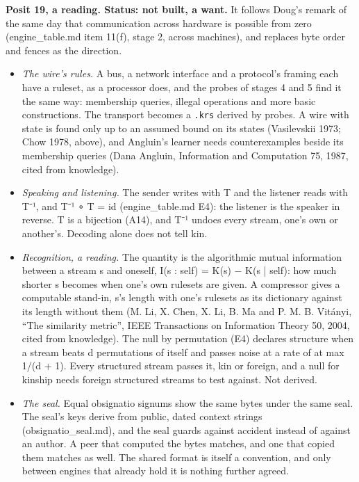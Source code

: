 \textbf{Posit 19, a reading. Status: not built, a want.} It follows Doug's remark of the same day that communication across hardware is possible from zero (engine\_\allowbreak{}table.md item 11(f), stage 2, across machines), and replaces byte order and fences as the direction.

\begin{itemize}
\item \emph{The wire's rules.} A bus, a network interface and a protocol's framing each have a ruleset, as a processor does, and the probes of stages 4 and 5 find it the same way: membership queries, illegal operations and more basic constructions. The transport becomes a \texttt{.\allowbreak{}krs} derived by probes. A wire with state is found only up to an assumed bound on its states (Vasilevskii 1973; Chow 1978, above), and Angluin's learner needs counterexamples beside its membership queries (Dana Angluin, Information and Computation 75, 1987, cited from knowledge).
\item \emph{Speaking and listening.} The sender writes with T and the listener reads with T⁻¹, and T⁻¹ ∘ T = id (engine\_\allowbreak{}table.md E4): the listener is the speaker in reverse. T is a bijection (A14), and T⁻¹ undoes every stream, one's own or another's. Decoding alone does not tell kin.
\item \emph{Recognition, a reading.} The quantity is the algorithmic mutual information between a stream s and oneself, I(s : self) = K(s) − K(s | self): how much shorter s becomes when one's own rulesets are given. A compressor gives a computable stand-in, s's length with one's rulesets as its dictionary against its length without them (M. Li, X. Chen, X. Li, B. Ma and P. M. B. Vitányi, “The similarity metric”, IEEE Transactions on Information Theory 50, 2004, cited from knowledge). The null by permutation (E4) declares structure when a stream beats d permutations of itself and passes noise at a rate of at max 1/(d + 1). Every structured stream passes it, kin or foreign, and a null for kinship needs foreign structured streams to test against. Not derived.
\item \emph{The seal.} Equal obsignatio signums show the same bytes under the same seal. The seal's keys derive from public, dated context strings (obsignatio\_\allowbreak{}seal.md), and the seal guards against accident instead of against an author. A peer that computed the bytes matches, and one that copied them matches as well. The shared format is itself a convention, and only between engines that already hold it is nothing further agreed.

\end{itemize}
